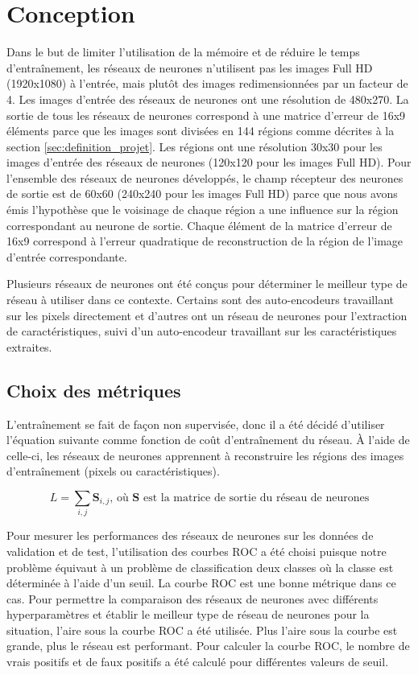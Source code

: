 \section{Conception}
    Dans le but de limiter l'utilisation de la mémoire et de réduire le temps d'entraînement, les réseaux de neurones n'utilisent pas les images Full HD (1920x1080) à l'entrée, mais plutôt des images redimensionnées par un facteur de 4. Les images d'entrée des réseaux de neurones ont une résolution de 480x270. La sortie de tous les réseaux de neurones correspond à une matrice d'erreur de 16x9 éléments parce que les images sont divisées en 144 régions comme décrites à la section \ref{sec:definition_projet}. Les régions ont une résolution 30x30 pour les images d'entrée des réseaux de neurones (120x120 pour les images Full HD). Pour l'ensemble des réseaux de neurones développés, le champ récepteur des neurones de sortie est de 60x60 (240x240 pour les images Full HD) parce que nous avons émis l'hypothèse que le voisinage de chaque région a une influence sur la région correspondant au neurone de sortie. Chaque élément de la matrice d'erreur de 16x9 correspond à l'erreur quadratique de reconstruction de la région de l'image d'entrée correspondante.
    \bigskip
    
    Plusieurs réseaux de neurones ont été conçus pour déterminer le meilleur type de réseau à utiliser dans ce contexte. Certains sont des auto-encodeurs travaillant sur les pixels directement et d'autres ont un réseau de neurones pour l'extraction de caractéristiques, suivi d'un auto-encodeur travaillant sur les caractéristiques extraites.

\subsection{Choix des métriques}
    L'entraînement se fait de façon non supervisée, donc il a été décidé d'utiliser l'équation suivante comme fonction de coût d'entraînement du réseau. À l'aide de celle-ci, les réseaux de neurones apprennent à reconstruire les régions des images d'entraînement (pixels ou caractéristiques).
    
    \begin{equation}
        L = \sum_{i,j} \mathbf{S}_{i,j} \text{, où } \mathbf{S} \text{ est la matrice de sortie du réseau de neurones}
    \end{equation}
    
    Pour mesurer les performances des réseaux de neurones sur les données de validation et de test, l'utilisation des courbes ROC a été choisi puisque notre problème équivaut à un problème de classification deux classes où la classe est déterminée à l'aide d'un seuil. La courbe ROC est une bonne métrique dans ce cas. Pour permettre la comparaison des réseaux de neurones avec différents hyperparamètres et établir le meilleur type de réseau de neurones pour la situation, l'aire sous la courbe ROC a été utilisée. Plus l'aire sous la courbe est grande, plus le réseau est performant. Pour calculer la courbe ROC, le nombre de vrais positifs et de faux positifs a été calculé pour différentes valeurs de seuil.


